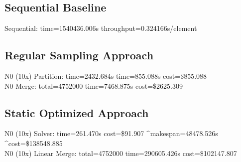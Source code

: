\documentclass[]{interact}
\theoremstyle{plain}
\theoremstyle{definition}
\theoremstyle{remark}
\begin{document}
\subsection{Sequential Baseline}
Sequential: time=1540436.006\textmu s throughput=0.324166\textmu s/element

\subsection{Regular Sampling Approach}
N0 (10x) Partition: time=2432.684\textmu s time=855.088\textmu s cost=\$855.088\\
N0 Merge: total=4752000 time=7468.875\textmu s cost=\$2625.309

\subsection{Static Optimized Approach}
N0 (10x) Solver: time=261.470\textmu s cost=\$91.907 \^{}makespan=48478.526\textmu s \^{}cost=\$138548.885\\
N0 (10x) Linear Merge: total=4752000 time=290605.426\textmu s cost=\$102147.807
\end{document}
